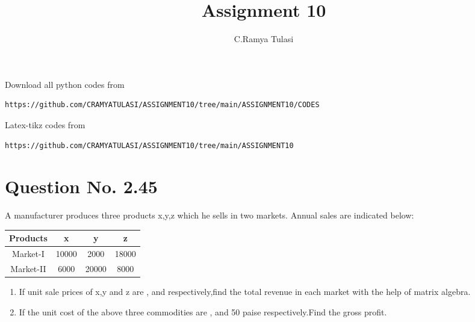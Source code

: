 \documentclass[journal,12pt,twocolumn]{IEEEtran}
\begin{document}
     \def\rightbox#1{\makebox[0in][r]{#1}}
     \def\centbox#1{\makebox[0in]{#1}}
     \def\topbox#1{\raisebox{-\baselineskip}[0in][0in]{#1}}
     \def\midbox#1{\raisebox{-0.5\baselineskip}[0in][0in]{#1}}
\vspace{3cm}
\title{Assignment 10}
\author{C.Ramya Tulasi}
\maketitle
\newpage
\bigskip
\renewcommand{\thefigure}{\theenumi}
\renewcommand{\thetable}{\theenumi}
Download all python codes from 
\begin{lstlisting}
https://github.com/CRAMYATULASI/ASSIGNMENT10/tree/main/ASSIGNMENT10/CODES
\end{lstlisting}
%
Latex-tikz codes from 
%
\begin{lstlisting}
https://github.com/CRAMYATULASI/ASSIGNMENT10/tree/main/ASSIGNMENT10
\end{lstlisting}
%
\section{Question No. 2.45}

A manufacturer produces three products x,y,z which he sells in two markets. Annual sales are indicated below:
\begin{table}[!ht]
\begin{tabular*}{0.75\columnwidth}{|c|c|c|c|}
\hline
Products  & x     & y     & z     \\ 
\hline
Market-I  & 10000 & 2000  & 18000 \\
\hline
Market-II & 6000  & 20000 & 8000  \\ 
\hline
\end{tabular*}
\end{table}
\begin{enumerate}
\item If unit sale prices of x,y and z are , and  respectively,find the total revenue in each market with the help of matrix algebra.
\item If the unit cost of the above three commodities are , and 50 paise respectively.Find the gross profit.
\end{enumerate}
\end{document}

